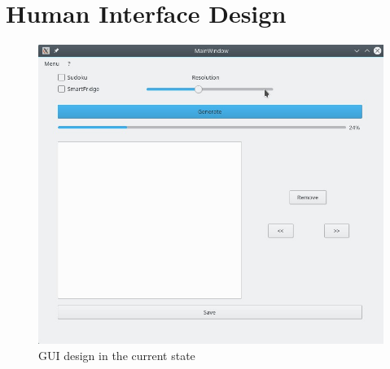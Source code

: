 \documentclass[a4paper,12pt]{article}
\begin{document}
\section{Human Interface Design}
\begin{figure}[H]
\includegraphics[scale=0.50]{UI.jpeg}
\caption{GUI design in the current state}
\end{figure}
\end{document}
